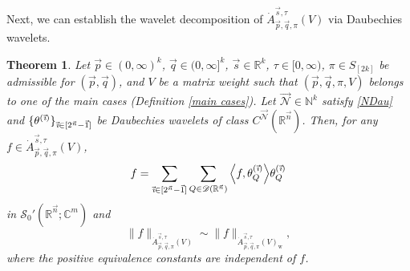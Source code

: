 \documentclass[11pt, reqno]{amsart}
\newtheorem{theorem}{Theorem}[section]
\theoremstyle{definition}
\theoremstyle{remark}
\numberwithin{equation}{section}
\newcommand{\D}{\mathscr D}
\newcommand{\R}{\mathbb R}
\newcommand{\vi}{\vec{\textit{\i}}}
\newcommand{\vn}{\vec n}
\newcommand{\vp}{\vec p}
\newcommand{\vq}{\vec q}
\newcommand{\vs}{\vec s}
\begin{document}
Next, we can establish the wavelet decomposition of $\dot A^{\vec s,\tau}_{\vec p,\vec q,\pi}(V)$
via Daubechies wavelets.

\begin{theorem}\label{wavelet 2}
Let $\vp\in(0,\infty)^k$, $\vq\in(0,\infty]^k$, $\vs\in\R^k$, $\tau\in[0,\infty)$,
$\pi\in S_{[2k]}$ be admissible for $(\vp,\vq)$,
and $V$ be a matrix weight such that $(\vp,\vq,\pi,V)$ belongs
to one of the main cases (Definition \ref{main cases}).
Let $\vec{\mathscr N}\in\mathbb{N}^k$ satisfy \eqref{NDau} and
$\{\theta^{(\vi)}\}_{\vi\in[2^{\vn}-\vec1]}$
be Daubechies wavelets of class
$C^{\vec{\mathscr N}}(\mathbb R^{\vn})$.
Then, for any $f\in \dot A^{\vec s,\tau}_{\vec p,\vec q,\pi}(V)$,
\begin{equation}\label{204}
f= \sum_{\vi\in[2^{\vn}-\vec1]}
\sum_{Q\in\D(\R^{\vn})}
\Big\langle f,\theta^{(\vi)}_Q\Big\rangle\theta^{(\vi)}_Q
\end{equation}
in $\mathscr{S}_0'(\mathbb R^{\vn};\mathbb C^m)$ and
\begin{equation}\label{2160}
\|f\|_{\dot A^{\vec s,\tau}_{\vec p,\vec q,\pi}(V)}
\sim\|f\|_{\dot A^{\vec s,\tau}_{\vec p,\vec q,\pi}(V)_\mathrm{w}},
\end{equation}
where the positive equivalence constants are independent of $f$.
\end{theorem}
\end{document}
